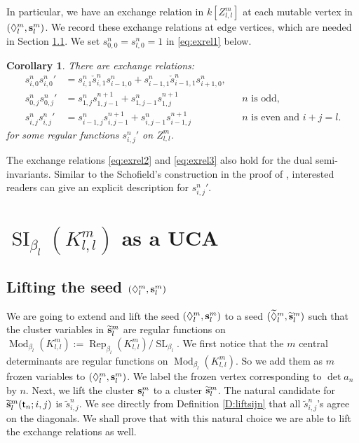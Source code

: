 \documentclass{amsart}
\newtheorem{corollary}[theorem]{Corollary}
\theoremstyle{definition}
\theoremstyle{remark}
\numberwithin{equation}{section}
\DeclareMathOperator{\Mod}{Mod}
\DeclareMathOperator{\Rep}{Rep}
\DeclareMathOperator{\SI}{SI}
\DeclareMathOperator{\SL}{SL}
\renewcommand{\b}[1]{\bold{#1}}
\newcommand{\wtd}[1]{\widetilde{#1}}
\renewcommand{\t}{{\sf t}}
\newcommand{\kllm}{{K_{l,l}^m}}
\newcommand{\zllm}{{Z_{l,l}^m}}
\newcommand{\bl}{{\beta_l}}
\newcommand{\ijn}{_{i,j}^{n}}
\begin{document}
In particular, we have an exchange relation in $k[\zllm]$ at each mutable vertex in $(\Diamond_l^m,\b{s}_l^m)$.
We record these exchange relations at edge vertices, which are needed in Section \ref{ss:liftseed}. 
We set $s_{0,0}^n=s_{l,0}^n=1$ in \eqref{eq:exrel1} below.
\begin{corollary} There are exchange relations:\begin{align} 	
	\label{eq:exrel1} s_{i,0}^n {s_{i,0}^n}'&=s_{i,1}^n\check{s}_{i,1}^ns_{i-1,0}^n+s_{i-1,1}^n\check{s}_{i-1,1}^ns_{i+1,0}^n,\\
	\label{eq:exrel2} s_{0,j}^n {s_{0,j}^n}'&=s_{1,j}^n s_{1,j-1}^{n+1} + s_{1,j-1}^{n} s_{1,j}^{n+1} && \text{$n$ is odd,}\\
	\label{eq:exrel3} s\ijn {s\ijn}'&=s_{i-1,j}^n s_{i,j-1}^{n+1} + s_{i,j-1}^{n} s_{i-1,j}^{n+1} && \text{$n$ is even and } i+j=l.
	\end{align} for some regular functions ${s\ijn}'$ on $\zllm$. \end{corollary}
\noindent  The exchange relations \eqref{eq:exrel2} and \eqref{eq:exrel3} also hold for the dual semi-invariants.  
Similar to the Schofield's construction in the proof of \cite[Lemma 4.12]{FW}, interested readers can give an explicit description for ${s\ijn}'$.   


\section{$\SI_\bl(\kllm)$ as a UCA} \label{S:CSmain}
\subsection{Lifting the seed $(\Diamond_l^m,\b{s}_l^m)$} \label{ss:liftseed}
We are going to extend and lift the seed $(\Diamond_l^m,\b{s}_l^m)$ to a seed $(\wtd{\Diamond}_l^m,\wtd{\b{s}}_l^m)$ such that the cluster variables in $\wtd{\b{s}}_l^m$ are regular functions on $\Mod_{\bl}(\kllm):=\Rep_{\bl}(\kllm)/\SL_{\bl}$.
We first notice that the $m$ central determinants are regular functions on $\Mod_{\bl}(\kllm)$.
So we add them as $m$ frozen variables to $(\Diamond_l^m,\b{s}_l^m)$.
We label the frozen vertex corresponding to $\det a_n$ by $n$.
Next, we lift the cluster $\b{s}_l^m$ to a cluster $\wtd{\b{s}}_l^m$.
The natural candidate for $\wtd{\b{s}}_l^m(\t_n;i,j)$ is $\wtd{s}\ijn$.
We see directly from Definition \ref{D:liftsijn} that all $\wtd{s}\ijn$'s agree on the diagonals.
We shall prove that with this natural choice we are able to lift the exchange relations as well.  
  
\end{document}
